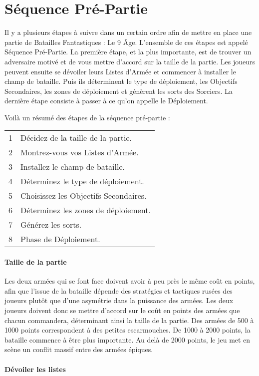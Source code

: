 
\part{Séquence Pré-Partie}

Il y a plusieurs étapes à suivre dans un certain ordre afin de mettre en place une partie de Batailles Fantastiques : Le 9\ieme{} Âge. L'ensemble de ces étapes est appelé Séquence Pré-Partie. La première étape, et la plus importante, est de trouver un adversaire motivé et de vous mettre d'accord sur la taille de la partie. Les joueurs peuvent ensuite se dévoiler leurs Listes d'Armée et commencer à installer le champ de bataille. Puis ils déterminent le type de déploiement, les Objectifs Secondaires, les zones de déploiement et génèrent les sorts des Sorciers. La dernière étape consiste à passer à ce qu'on appelle le Déploiement.

Voilà un résumé des étapes de la séquence pré-partie :

\hspace*{0.3cm}
\begin{tabular}{c|l}
1 & Décidez de la taille de la partie. \tabularnewline
2 & Montrez-vous vos Listes d'Armée. \tabularnewline
3 & Installez le champ de bataille. \tabularnewline
4 & Déterminez le type de déploiement. \tabularnewline
5 & Choisissez les Objectifs Secondaires. \tabularnewline
6 & Déterminez les zones de déploiement. \tabularnewline
7 & Générez les sorts. \tabularnewline
8 & Phase de Déploiement. \tabularnewline
\end{tabular}

\subsection{Taille de la partie}

Les deux armées qui se font face doivent avoir à peu près le même coût en points, afin que l'issue de la bataille dépende des stratégies et tactiques rusées des joueurs plutôt que d'une asymétrie dans la puissance des armées. Les deux joueurs doivent donc se mettre d'accord sur le coût en points des armées que chacun commandera, déterminant ainsi la taille de la partie. Des armées de 500 à 1000 points correspondent à des petites escarmouches. De 1000 à 2000 points, la bataille commence à être plus importante. Au delà de 2000 points, le jeu met en scène un conflit massif entre des armées épiques.

\subsection{Dévoiler les listes}

